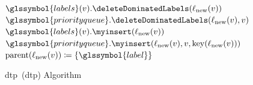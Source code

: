 \begin{algorithm}[tb!]
{{{{        }
        {
          $\glssymbol{labels}(\vertexb).\deleteDominatedLabels(\labnew(\vertexb))$\;
          $\glssymbol{priorityqueue}.\deleteDominatedLabels(\labnew(\vertexb), \vertexb)$\;
            \label{ch:switching:sec:exploit_structural_characteristics:subsec:dtp:alg:shortest_theta_path:line:delete_dominated_Q}
          $\glssymbol{labels}(\vertexb).\myinsert(\labnew(\vertexb))$\;
            \label{ch:switching:sec:exploit_structural_characteristics:subsec:dtp:alg:shortest_theta_path:line:insert_L}
          $\glssymbol{priorityqueue}.\myinsert(\labnew(\vertexb),\vertexb,
            \mathrm{key}(\labnew(\vertexb)))$\;
            \label{ch:switching:sec:exploit_structural_characteristics:subsec:dtp:alg:shortest_theta_path:line:insert_Q}
          $\parent(\labnew(\vertexb)) \coloneqq \{\glssymbol{label}\}$\;
        } %
      } %
    } %
  } \vspace{-2mm} %
  \;
  \caption{\acrlong{dtp}~(\gls{dtp}) Algorithm}%
\label{ch:switching:sec:exploit_structural_characteristics:subsec:dtp:alg:shortest_theta_path}%
\end{algorithm}%
% 


